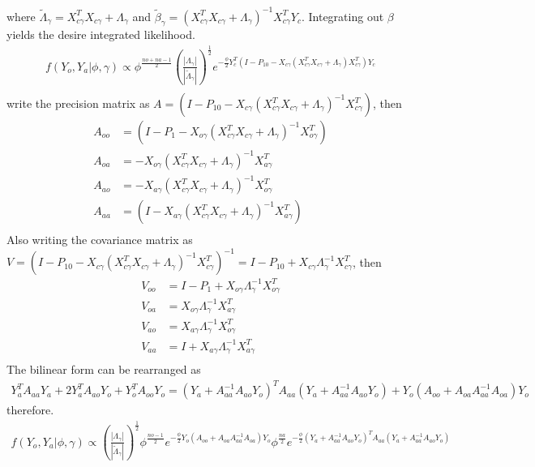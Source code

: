 \documentclass[9pt]{article}
\begin{document}
where $\tilde{\Lambda}_{\gamma}=X_{c\gamma}^{T}X_{c\gamma}+\Lambda_{\gamma}$ and $\tilde{\beta}_{\gamma}=(X_{c\gamma}^{T}X_{c\gamma}+\Lambda_{\gamma})^{-1}X_{c\gamma}^{T}Y_{c}$. Integrating out $\beta$ yields the desire integrated likelihood.
\begin{align*}
	f(Y_{o},Y_{a}|\phi,\gamma) \propto \phi^{\frac{no+na-1}{2}}\left( \frac{|\Lambda_{\gamma}|}{|\tilde{\Lambda}_{\gamma}|}\right) ^{\frac{1}{2}}e^{-\frac{\phi}{2}Y_{c}^{T}(I-P_{10}-X_{c\gamma}(X_{c\gamma}^{T}X_{c\gamma}+\Lambda_{\gamma})X_{c\gamma}^{T})Y_{c}}\\
\end{align*}
write the precision matrix as $A=(I-P_{10}-X_{c\gamma}(X_{c\gamma}^{T}X_{c\gamma}+\Lambda_{\gamma})^{-1}X_{c\gamma}^{T})$, then 
	\begin{align*}
		A_{oo}&=(I-P_{1}-X_{o\gamma}(X_{c\gamma}^{T}X_{c\gamma}+\Lambda_{\gamma})^{-1}X_{o\gamma}^{T})\\
		A_{oa}&=-X_{o\gamma}(X_{c\gamma}^{T}X_{c\gamma}+\Lambda_{\gamma})^{-1}X_{a\gamma}^{T}\\
		A_{ao}&=-X_{a\gamma}(X_{c\gamma}^{T}X_{c\gamma}+\Lambda_{\gamma})^{-1}X_{o\gamma}^{T}\\
		A_{aa}&=(I-X_{a\gamma}(X_{c\gamma}^{T}X_{c\gamma}+\Lambda_{\gamma})^{-1}X_{a\gamma}^{T})\\
	\end{align*}
	Also writing the covariance matrix as $V=(I-P_{10}-X_{c\gamma}(X_{c\gamma}^{T}X_{c\gamma}+\Lambda_{\gamma})^{-1}X_{c\gamma}^{T})^{-1}=I-P_{10}+X_{c\gamma}\Lambda_{\gamma}^{-1}X_{c\gamma}^{T}$, then
	\begin{align*}
		V_{oo}&=I-P_{1}+X_{o\gamma}\Lambda_{\gamma}^{-1}X_{o\gamma}^{T}\\
		V_{oa}&=X_{o\gamma}\Lambda_{\gamma}^{-1}X_{a\gamma}^{T}\\
		V_{ao}&=X_{a\gamma}\Lambda_{\gamma}^{-1}X_{o\gamma}^{T}\\
		V_{aa}&=I+X_{a\gamma}\Lambda_{\gamma}^{-1}X_{a\gamma}^{T}\\
	\end{align*}
 The bilinear form can be rearranged as
\begin{align*}
	Y_{a}^{T}A_{aa}Y_{a}+2Y_{a}^{T}A_{ao}Y_{o}+Y_{o}^{T}A_{oo}Y_{o}=(Y_{a}+A_{aa}^{-1}A_{ao}Y_{o})^{T}A_{aa}(Y_{a}+A_{aa}^{-1}A_{ao}Y_{o})+Y_{o}(A_{oo}+A_{oa}A_{aa}^{-1}A_{oa})Y_{o}
\end{align*}
therefore.
\begin{align*}
	f(Y_{o},Y_{a}|\phi,\gamma) \propto \left( \frac{|\Lambda_{\gamma}|}{|\tilde{\Lambda}_{\gamma}|}\right) ^{\frac{1}{2}} \phi^{\frac{no-1}{2}}e^{-\frac{\phi}{2}Y_{o}(A_{oo}+A_{oa}A_{aa}^{-1}A_{oa})Y_{o}}\phi^{\frac{na}{2}}e^{-\frac{\phi}{2}(Y_{a}+A_{aa}^{-1}A_{ao}Y_{o})^{T}A_{aa}(Y_{a}+A_{aa}^{-1}A_{ao}Y_{o})}\\
\end{align*}
\end{document}
